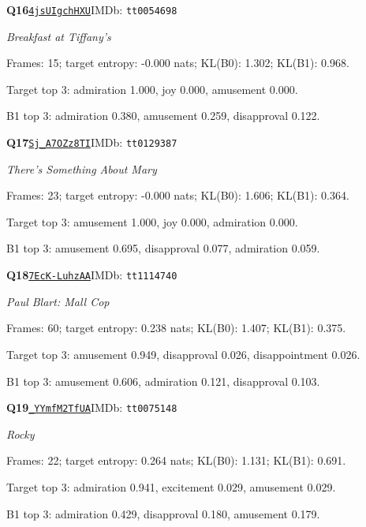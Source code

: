 \par\noindent\begin{minipage}{\textwidth}\small
\textbf{Q16}\quad\href{https://www.youtube.com/watch?v=4jsUIgchHXU}{\texttt{4jsUIgchHXU}}\quad IMDb: \texttt{tt0054698}\par
\textit{Breakfast at Tiffany's}\par
Frames: 15; target entropy: -0.000 nats; KL(B0): 1.302; KL(B1): 0.968.\par
Target top 3: admiration 1.000, joy 0.000, amusement 0.000.\par
B1 top 3: admiration 0.380, amusement 0.259, disapproval 0.122.\par
\end{minipage}\par\medskip
\par\noindent\begin{minipage}{\textwidth}\small
\textbf{Q17}\quad\href{https://www.youtube.com/watch?v=Sj_A7OZz8TI}{\texttt{Sj\_A7OZz8TI}}\quad IMDb: \texttt{tt0129387}\par
\textit{There's Something About Mary}\par
Frames: 23; target entropy: -0.000 nats; KL(B0): 1.606; KL(B1): 0.364.\par
Target top 3: amusement 1.000, joy 0.000, admiration 0.000.\par
B1 top 3: amusement 0.695, disapproval 0.077, admiration 0.059.\par
\end{minipage}\par\medskip
\par\noindent\begin{minipage}{\textwidth}\small
\textbf{Q18}\quad\href{https://www.youtube.com/watch?v=7EcK-LuhzAA}{\texttt{7EcK-LuhzAA}}\quad IMDb: \texttt{tt1114740}\par
\textit{Paul Blart: Mall Cop}\par
Frames: 60; target entropy: 0.238 nats; KL(B0): 1.407; KL(B1): 0.375.\par
Target top 3: amusement 0.949, disapproval 0.026, disappointment 0.026.\par
B1 top 3: amusement 0.606, admiration 0.121, disapproval 0.103.\par
\end{minipage}\par\medskip
\par\noindent\begin{minipage}{\textwidth}\small
\textbf{Q19}\quad\href{https://www.youtube.com/watch?v=_YYmfM2TfUA}{\texttt{\_YYmfM2TfUA}}\quad IMDb: \texttt{tt0075148}\par
\textit{Rocky}\par
Frames: 22; target entropy: 0.264 nats; KL(B0): 1.131; KL(B1): 0.691.\par
Target top 3: admiration 0.941, excitement 0.029, amusement 0.029.\par
B1 top 3: admiration 0.429, disapproval 0.180, amusement 0.179.\par
\end{minipage}\par\medskip
